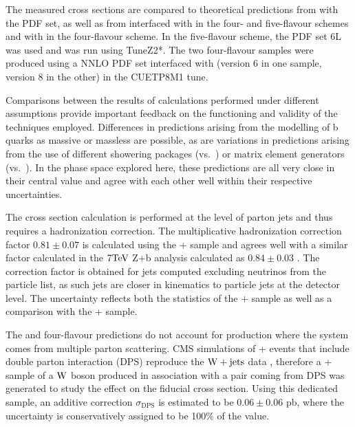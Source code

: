% 
The measured cross sections are compared to theoretical predictions from
 \MCFM \cite{Campbell:2010ff, Badger:2010mg}
 with the {} PDF set, as well as from
 interfaced with \PYTHIAs in the four- and five-flavour schemes and
  with \PYTHIAe \cite{ref:Pythia8} in the four-flavour scheme.
In the five-flavour scheme, the PDF set {\CTEQ6L} was
 used and \PYTHIAs was run using {TuneZ2*}.
The two four-flavour samples were produced using
 a NNLO PDF set interfaced with %
 \PYTHIA (version 6 in one sample, version 8 in the other)
 in the {CUETP8M1} tune.

Comparisons between the results of calculations performed
 under different assumptions provide important feedback
 on the functioning and validity of the techniques employed.
Differences in predictions arising from the modelling of
 b quarks as massive or massless are possible, as are
 variations in predictions arising from the use of different
 showering packages (\PYTHIAs vs.\ \PYTHIAe) or matrix element
 generators (\MADGRAPH vs.\ \MCFM).
In the phase space explored here, these predictions are all
 very close in their central value and agree with each other
 well within their respective uncertainties.

The \MCFM cross section calculation is
 performed at the level of parton jets and thus
 requires a hadronization correction.
The multiplicative hadronization correction factor $0.81\pm0.07$
 is calculated using the \MADGRAPH + \PYTHIAs sample
 and agrees well with a
 similar factor calculated in the $7\mathrm{TeV}$ Z+b analysis
 calculated as $0.84\pm0.03$  \cite{Chatrchyan:2014dha}.
The correction factor is obtained for
 jets computed excluding neutrinos from the particle list, as
 such jets are closer in kinematics
 to particle jets at the detector level.
The uncertainty reflects both the statistics of the
 \MADGRAPH + \PYTHIAs sample as well as a comparison with the
 \MADGRAPH + \PYTHIAe sample.

The \MCFM and four-flavour \MADGRAPH predictions do not account for
 \wbb production where the \bbbar system comes from multiple parton scattering.
CMS simulations of \MADGRAPH + \PYTHIA events that include
 double parton interaction (DPS) reproduce the $\mathrm{W}+\mathrm{jets}$ data \cite{Chatrchyan:2013xxa},
 therefore a \MADGRAPH + \PYTHIAe sample of a $\mathrm{W}$ boson produced in association with a
 \bbbar pair coming from DPS
 was generated to study the effect on the fiducial cross section.
Using this dedicated sample, an additive correction $\sigma_{\mathrm{DPS}}$
 is estimated to be $0.06\pm0.06$ pb, where the uncertainty
 is conservatively assigned to be 100$\%$ of the value.

